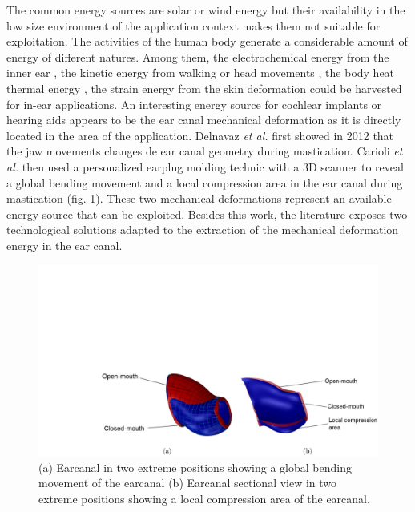 \documentclass[3p,twocolumn,preprint]{elsarticle}
\begin{document}
The common energy sources are solar or wind energy but their availability in the low size environment of the application context makes them not suitable for exploitation. The activities of the human body generate a considerable amount of energy of different natures. Among them, the electrochemical energy from the inner ear \cite{Mercier2012}, the kinetic energy from walking or head movements \cite{Azimi2021,Smilek2016}, the body heat thermal energy \cite{Kim2014}, the strain energy from the skin deformation \cite{Jin2021} could be harvested for in-ear applications. An interesting energy source for cochlear implants or hearing aids appears to be the ear canal mechanical deformation as it is directly located in the area of the application. Delnavaz \emph{et al.} first showed in 2012 that the jaw movements changes de ear canal geometry during mastication. Carioli \emph{et al.} then used a personalized earplug molding technic with a 3D scanner to reveal a global bending movement and a local compression area in the ear canal during mastication \cite{Carioli2016} (fig. \ref{fig:molding}). These two mechanical deformations represent an available energy source that can be exploited. Besides this work, the literature exposes two technological solutions adapted to the extraction of the mechanical deformation energy in the ear canal.
\begin{figure}[!htbp]
	\centering
	\captionsetup{justification=centering}
	\includegraphics[trim={6cm 0cm 0cm 10cm},clip, width=0.6\linewidth]{figures/molding.pdf}
	\caption{(a) Earcanal in two extreme positions showing a global bending movement of the earcanal (b) Earcanal sectional view in two extreme positions showing a local compression area of the earcanal. \cite{Carioli2016}}
	\label{fig:molding}
\end{figure}
\end{document}
